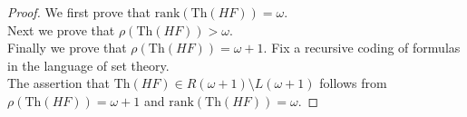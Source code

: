 \documentclass{article}
\begin{document}
\begin{proof}
    We first prove that $\text{rank}(\text{Th}(HF)) =\omega$. \\

    Next we prove that $\rho(\text{Th}(HF))>\omega$. \\

    Finally we prove that $\rho(\text{Th}(HF)) =\omega+1$. Fix a recursive
    coding of formulas in the language of set theory. \\

    The assertion that $\text{Th}(HF) \in R(\omega+1) \setminus
    L(\omega+1)$ follows from $\rho(\text{Th}(HF)) =\omega+1$ and
    $\text{rank}(\text{Th}(HF)) =\omega$.
  \end{proof}
\end{document}
